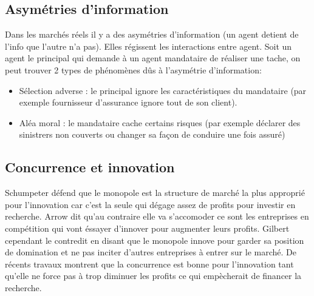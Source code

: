 
\subsection{Asymétries d'information} %
\label{sec:asymetries_d_information}

Dans les marchés réels il y a des asymétries d'information (un agent detient de l'info que l'autre n'a pas). Elles régissent les interactions entre agent. Soit un agent le principal qui demande à un agent mandataire de réaliser une tache, on peut trouver 2 types de phénomènes dûs à l'asymétrie d'information:
\begin{itemize}
	\item Sélection adverse : le principal ignore les caractéristiques du mandataire (par exemple fournisseur d'assurance ignore tout de son client).
	\item Aléa moral : le mandataire cache certains risques (par exemple déclarer des sinistrers non couverts ou changer sa façon de conduire une fois assuré)
\end{itemize}
\subsection{Concurrence et innovation} %
\label{sec:concurrence_et_innovation}

Schumpeter défend que le monopole est la structure de marché la plus approprié pour l'innovation car c'est la seule qui dégage assez de profits pour investir en recherche. Arrow dit qu'au contraire elle va s'accomoder ce sont les entreprises en compétition qui vont éssayer d'innover pour augmenter leurs profits. Gilbert cependant le contredit en disant que le monopole innove pour garder sa position de domination et ne pas inciter d'autres entreprises à entrer sur le marché. De récents travaux montrent que la concurrence est bonne pour l'innovation tant qu'elle ne force pas à trop diminuer les profits ce qui empècherait de financer la recherche.






